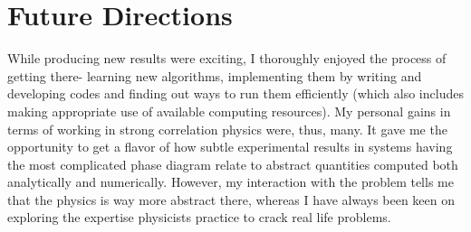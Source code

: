 \documentclass[a4paper,11pt]{article}
\begin{document}
\section{Future Directions}
 
While producing new results were exciting, I thoroughly enjoyed the process of getting there- 
learning new algorithms, implementing them by writing and developing codes and finding out ways to run them
efficiently (which also includes making appropriate use of available computing resources). My personal gains in terms of
working in strong correlation physics were, thus, many. It gave me the opportunity to get a flavor of 
how subtle experimental results in systems having the most complicated phase diagram relate to abstract quantities computed both
analytically and numerically. However, my interaction with the problem tells 
me that the physics is way more abstract there, whereas I have always been keen on exploring the expertise physicists practice to crack
real life problems.    
  
\end{document}
